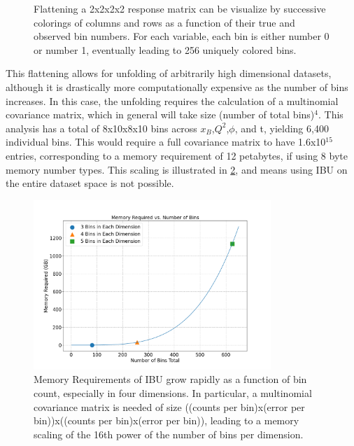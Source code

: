 \begin{figure}[H]
{            \label{fig:response_matrix_xb_q2_phi_t}}
            \caption[Flattening Map on 4D 2 Bin Example]{Flattening a 2x2x2x2 response matrix can be visualize by successive colorings of columns and rows as a function of their true and observed bin numbers. For each variable, each bin is either number 0 or number 1, eventually leading to 256 uniquely colored bins.}
            \label{fig:unrolling}
        \end{figure}
    
        
        


        This flattening allows for unfolding of arbitrarily high dimensional datasets, although it is drastically more computationally expensive as the number of bins increases. In this case, the unfolding requires the calculation of a multinomial covariance matrix, which in general will take size (number of total bins)$^4$. This analysis has a total of 8x10x8x10 bins across $x_B$,$Q^2$,$\phi$, and t, yielding 6,400 individual bins. This would require a full covariance matrix to have 1.6x10$^{15}$ entries, corresponding to a memory requirement of 12 petabytes, if using 8 byte memory number types. This scaling is illustrated in \ref{fig:ibu_mem_scale}, and means using IBU on the entire dataset space is not possible. 

        \begin{figure}[ht]
            \centering
            \includegraphics[trim={0 0 0 0},clip,width=0.8\textwidth]{Chapters/Ch5-Further/0_IBU/pics/memory_required_vs_number_of_bins_in_each_dim.png}
            \caption[Memory Requirements of IBU]{Memory Requirements of IBU grow rapidly as a function of bin count, especially in four dimensions. In particular, a multinomial covariance matrix is needed of size ((counts per bin)x(error per bin))x((counts per bin)x(error per bin)), leading to a memory scaling of the 16th power of the number of bins per dimension.}
            \label{fig:ibu_mem_scale}
        \end{figure}


